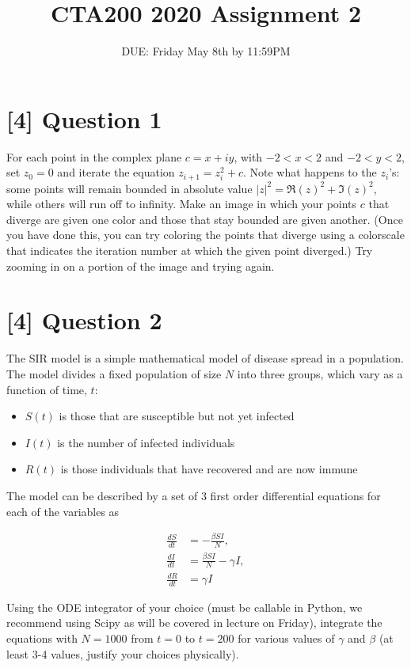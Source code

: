 \documentclass{article}
\title{CTA200 2020 Assignment 2}
\author{DUE: Friday May 8th by 11:59PM}
\date{}
\begin{document}
\maketitle

\section*{[4] Question 1}

For each point in the complex plane $c = x + iy$, with $-2 < x < 2$ and $-2 < y < 2$, set $z_0 = 0$ and iterate the equation $z_{i + 1} = z_i^2 + c$. 
Note what happens to the $z_i$'s: some points will remain bounded in absolute value $|z|^2 = \Re(z)^2 + \Im(z)^2$, while others will run off to infinity. 
Make an image  in which your points $c$ that diverge are given one color and those that stay bounded are given another.
(Once you have done this, you can try coloring the points that diverge using a colorscale that indicates the iteration number at which the given point diverged.) 
Try zooming in on a portion of the image and trying again.  


\section*{[4] Question 2}

The SIR model is a simple mathematical model of disease spread in a population.
The model divides a fixed population of size $N$ into three groups, which vary as a function of time, $t$:

\begin{itemize}
    \item $S(t)$ is those that are susceptible but not yet infected
    \item $I(t)$ is the number of infected individuals
    \item $R(t)$ is those individuals that have recovered and are now immune
\end{itemize}

The model can be described by a set of 3 first order differential equations for each of the variables as

\begin{align}
    \frac{dS}{dt} &= -\frac{\beta S I}{N},\\
    \frac{dI}{dt} &= \frac{\beta S I}{N} - \gamma I,\\
    \frac{dR}{dt} &= \gamma I
\end{align}

Using the ODE integrator of your choice (must be callable in Python, we recommend using Scipy as will be covered in lecture on Friday), integrate the equations with $N=1000$ from $t=0$ to $t=200$ for various values of $\gamma$ and $\beta$ (at least 3-4 values, justify your choices physically).
\end{document}
